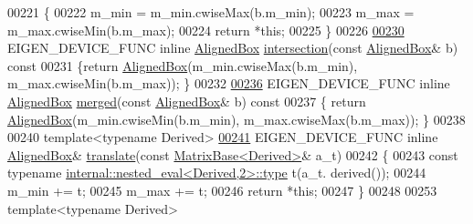 \begin{DoxyCode}
00221   \{
00222     m\_min = m\_min.cwiseMax(b.m\_min);
00223     m\_max = m\_max.cwiseMin(b.m\_max);
00224     \textcolor{keywordflow}{return} *\textcolor{keyword}{this};
00225   \}
00226 
\hyperlink{group___geometry___module_ac31024e7fccb025810535eb5a673ed14}{00230}   EIGEN\_DEVICE\_FUNC \textcolor{keyword}{inline} \hyperlink{group___geometry___module_class_eigen_1_1_aligned_box}{AlignedBox} \hyperlink{group___geometry___module_ac31024e7fccb025810535eb5a673ed14}{intersection}(\textcolor{keyword}{const} 
      \hyperlink{group___geometry___module_class_eigen_1_1_aligned_box}{AlignedBox}& b)\textcolor{keyword}{ const}
00231 \textcolor{keyword}{  }\{\textcolor{keywordflow}{return} \hyperlink{group___geometry___module_aeb7682d3d8676752e9b789b51d950872}{AlignedBox}(m\_min.cwiseMax(b.m\_min), m\_max.cwiseMin(b.m\_max)); \}
00232 
\hyperlink{group___geometry___module_a8182b7661c4b244285ca0f831363b00a}{00236}   EIGEN\_DEVICE\_FUNC \textcolor{keyword}{inline} \hyperlink{group___geometry___module_class_eigen_1_1_aligned_box}{AlignedBox} \hyperlink{group___geometry___module_a8182b7661c4b244285ca0f831363b00a}{merged}(\textcolor{keyword}{const} \hyperlink{group___geometry___module_class_eigen_1_1_aligned_box}{AlignedBox}& b)\textcolor{keyword}{ const}
00237 \textcolor{keyword}{  }\{ \textcolor{keywordflow}{return} \hyperlink{group___geometry___module_aeb7682d3d8676752e9b789b51d950872}{AlignedBox}(m\_min.cwiseMin(b.m\_min), m\_max.cwiseMax(b.m\_max)); \}
00238 
00240   \textcolor{keyword}{template}<\textcolor{keyword}{typename} Derived>
\hyperlink{group___geometry___module_af869911480769d718514cd008dd191dc}{00241}   EIGEN\_DEVICE\_FUNC \textcolor{keyword}{inline} \hyperlink{group___geometry___module_class_eigen_1_1_aligned_box}{AlignedBox}& \hyperlink{group___geometry___module_af869911480769d718514cd008dd191dc}{translate}(\textcolor{keyword}{const} 
      \hyperlink{group___core___module_class_eigen_1_1_matrix_base}{MatrixBase<Derived>}& a\_t)
00242   \{
00243     \textcolor{keyword}{const} \textcolor{keyword}{typename} \hyperlink{class_eigen_1_1internal_1_1_tensor_lazy_evaluator_writable}{internal::nested\_eval<Derived,2>::type} t(a\_t.
      derived());
00244     m\_min += t;
00245     m\_max += t;
00246     \textcolor{keywordflow}{return} *\textcolor{keyword}{this};
00247   \}
00248 
00253   \textcolor{keyword}{template}<\textcolor{keyword}{typename} Derived>

\end{DoxyCode}
